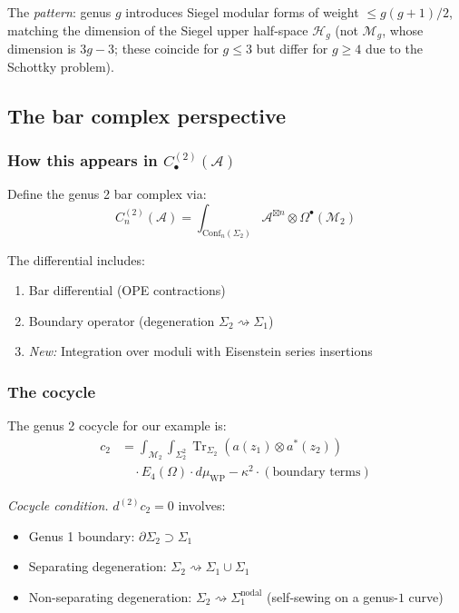 The \emph{pattern}: genus $g$ introduces Siegel modular forms of weight
$\leq g(g+1)/2$, matching the dimension of the Siegel upper half-space
$\mathcal{H}_g$ (not $\mathcal{M}_g$, whose dimension is $3g-3$; these coincide
for $g \leq 3$ but differ for $g \geq 4$ due to the Schottky problem).

\subsection{The bar complex perspective}

\subsubsection{\texorpdfstring{How this appears in $C_{\bullet}^{(2)}(\mathcal{A})$}{How this appears in C-(2)(A)}}

Define the genus 2 bar complex via:
\[C_n^{(2)}(\mathcal{A}) = \int_{\mathrm{Conf}_n(\Sigma_2)} 
\mathcal{A}^{\boxtimes n} 
\otimes \Omega^{\bullet}(\mathcal{M}_2)\]

The differential includes:
\begin{enumerate}
\item Bar differential (OPE contractions)
\item Boundary operator (degeneration $\Sigma_2 \rightsquigarrow \Sigma_1$)
\item \emph{New:} Integration over moduli with Eisenstein series insertions
\end{enumerate}

\subsubsection{The cocycle}

The genus 2 cocycle for our example is:
\begin{align}
c_2 &= \int_{\mathcal{M}_2} \int_{\Sigma_2^2} 
\operatorname{Tr}_{\Sigma_2}(a(z_1) \otimes a^*(z_2)) \\
&\quad \cdot E_4(\Omega) \cdot d\mu_{\text{WP}}
- \kappa^2 \cdot (\text{boundary terms})
\end{align}

\emph{Cocycle condition.} $d^{(2)} c_2 = 0$ involves:
\begin{itemize}
\item Genus 1 boundary: $\partial \Sigma_2 \supset \Sigma_1$
\item Separating degeneration: $\Sigma_2 \rightsquigarrow \Sigma_1 \cup \Sigma_1$
\item Non-separating degeneration: $\Sigma_2 \rightsquigarrow \Sigma_1^{\text{nodal}}$ (self-sewing on a genus-$1$ curve)
\end{itemize}

